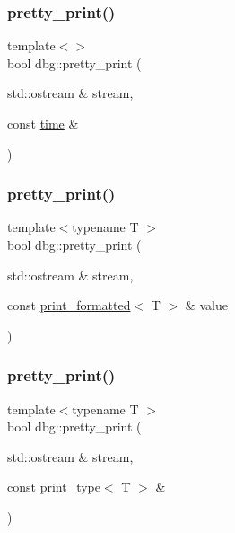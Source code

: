 \mbox{\label{namespacedbg_a43fb1da62bd4a702ea7ca37e665c53c9}} 
\subsubsection{\texorpdfstring{pretty\+\_\+print()}{pretty\_print()}\hspace{0.1cm}{\footnotesize\ttfamily [13/19]}}
{\footnotesize\ttfamily template$<$$>$ \\
bool dbg\+::pretty\+\_\+print (\begin{DoxyParamCaption}\item[{std\+::ostream \&}]{stream,  }\item[{const \hyperlink{structdbg_1_1time}{time} \&}]{ }\end{DoxyParamCaption})\hspace{0.3cm}{\ttfamily [inline]}}

\mbox{\label{namespacedbg_a3f0682f5939ac9a18ba7ee86a5c63243}} 
\subsubsection{\texorpdfstring{pretty\+\_\+print()}{pretty\_print()}\hspace{0.1cm}{\footnotesize\ttfamily [14/19]}}
{\footnotesize\ttfamily template$<$typename T $>$ \\
bool dbg\+::pretty\+\_\+print (\begin{DoxyParamCaption}\item[{std\+::ostream \&}]{stream,  }\item[{const \hyperlink{structdbg_1_1print__formatted}{print\+\_\+formatted}$<$ T $>$ \&}]{value }\end{DoxyParamCaption})\hspace{0.3cm}{\ttfamily [inline]}}

\mbox{\label{namespacedbg_abb85fb70314b6ada2e66eebeafcd15bf}} 
\subsubsection{\texorpdfstring{pretty\+\_\+print()}{pretty\_print()}\hspace{0.1cm}{\footnotesize\ttfamily [15/19]}}
{\footnotesize\ttfamily template$<$typename T $>$ \\
bool dbg\+::pretty\+\_\+print (\begin{DoxyParamCaption}\item[{std\+::ostream \&}]{stream,  }\item[{const \hyperlink{structdbg_1_1print__type}{print\+\_\+type}$<$ T $>$ \&}]{ }\end{DoxyParamCaption})\hspace{0.3cm}{\ttfamily [inline]}}

